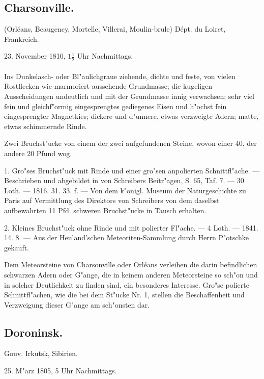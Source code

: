 \documentclass[a4paper, 11pt, oneside, polutonikogreek, german]{article}
\begin{document}
\subsection{Charsonville.}
\begin{center}
\small
(Orléans, Beaugency, Mortelle, Villerai, Moulin-brule) Dépt. du Loiret, Frankreich.

23. November 1810, $1\frac{1}{2}$ Uhr Nachmittags.
\end{center}
\paragraph{}
Ins Dunkelasch- oder Bl"aulichgraue ziehende, dichte und feste, von vielen Rostflecken wie marmoriert aussehende Grundmasse; die kugeligen Ausscheidungen undeutlich und mit der Grundmasse innig verwachsen; sehr viel fein und gleichf"ormig eingesprengtes gediegenes Eisen und h"ochst fein eingesprengter Magnetkies; dickere und d"unnere, etwas verzweigte Adern; matte, etwas schimmernde Rinde.

Zwei Bruchst"ucke von einem der zwei aufgefundenen Steine, wovon einer 40, der andere 20 Pfund wog.

1. Gro"ses Bruchst"uck mit Rinde und einer gro"sen anpolierten Schnittfl"ache. --- Beschrieben und abgebildet in von Schreibers Beitr"agen, S. 65, Taf. 7. --- 30 Loth. --- 1816. 31. 33. f. --- Von dem k"onigl. Museum der Naturgeschichte zu Paris auf Vermittlung des Direktors von Schreibers von dem daselbst aufbewahrten 11 Pfd. schweren Bruchst"ucke in Tausch erhalten.

2. Kleines Bruchst"uck ohne Rinde und mit polierter Fl"ache. --- 4 Loth. --- 1841. 14. 8. --- Aus der Heuland'schen Meteoriten-Sammlung durch Herrn P"otschke gekauft.

Dem Meteorsteine von Charsonville oder Orléans verleihen die darin befindlichen schwarzen Adern oder G"ange, die in keinem anderen Meteorsteine so sch"on und in solcher Deutlichkeit zu finden sind, ein besonderes Interesse. Gro"se polierte Schnittfl"achen, wie die bei dem St"ucke Nr. 1, stellen die Beschaffenheit und Verzweigung dieser G"ange am sch"onsten dar.
\subsection{Doroninsk.}
\begin{center}
\small
Gouv. Irkutsk, Sibirien.

25. M"arz 1805, 5 Uhr Nachmittags.
\end{center}
\end{document}
